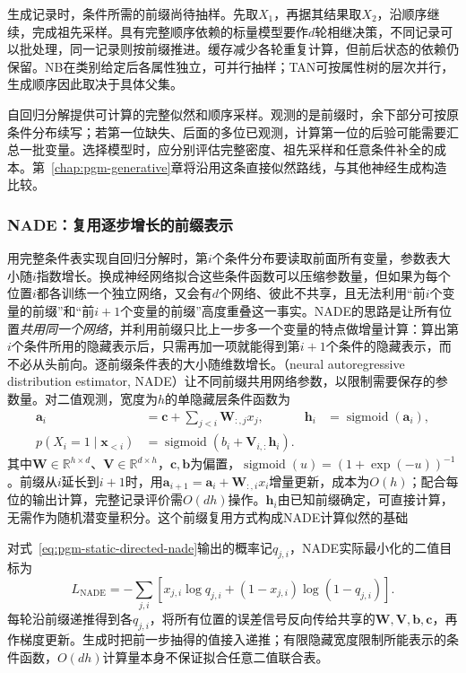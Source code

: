 生成记录时，条件所需的前缀尚待抽样。先取$X_1$，再据其结果取$X_2$，沿顺序继续，完成祖先采样。具有完整顺序依赖的标量模型要作$d$轮相继决策，不同记录可以批处理，同一记录则按前缀推进。缓存减少各轮重复计算，但前后状态的依赖仍保留。NB在类别给定后各属性独立，可并行抽样；TAN可按属性树的层次并行，生成顺序因此取决于具体父集。

自回归分解提供可计算的完整似然和顺序采样。观测的是前缀时，余下部分可按原条件分布续写；若第一位缺失、后面的多位已观测，计算第一位的后验可能需要汇总一批变量。选择模型时，应分别评估完整密度、祖先采样和任意条件补全的成本。第~\ref{chap:pgm-generative}章将沿用这条直接似然路线，与其他神经生成构造比较。

\subsubsection{NADE：复用逐步增长的前缀表示}
\label{sec:pgm-static-directed-nade-model}

用完整条件表实现自回归分解时，第$i$个条件分布要读取前面所有变量，参数表大小随$i$指数增长。换成神经网络拟合这些条件函数可以压缩参数量，但如果为每个位置$i$都各训练一个独立网络，又会有$d$个网络、彼此不共享，且无法利用“前$i$个变量的前缀”和“前$i+1$个变量的前缀”高度重叠这一事实。NADE的思路是让所有位置\emph{共用同一个网络}，并利用前缀只比上一步多一个变量的特点做增量计算：算出第$i$个条件所用的隐藏表示后，只需再加一项就能得到第$i+1$个条件的隐藏表示，而不必从头前向。逐前缀条件表的大小随维数增长。（neural autoregressive distribution estimator, NADE）让不同前缀共用网络参数，以限制需要保存的参数量。对二值观测，宽度为$h$的单隐藏层条件函数为
\begin{equation}
  \label{eq:pgm-static-directed-nade}
  \begin{aligned}
    \bm{a}_i&=\bm{c}+\sum_{j<i}\bm{W}_{:,j}x_j,&
    \bm{h}_i&=\operatorname{sigmoid}(\bm{a}_i),\\
    p(X_i=1\mid\bm{x}_{<i})
      &=\operatorname{sigmoid}
        (b_i+\bm{V}_{i,:}\bm{h}_i).
  \end{aligned}
\end{equation}
其中$\bm W\in\mathbb R^{h\times d}$、$\bm V\in\mathbb R^{d\times h}$，$\bm c,\bm b$为偏置，$\operatorname{sigmoid}(u)=(1+\exp(-u))^{-1}$。前缀从$i$延长到$i+1$时，用$\bm a_{i+1}=\bm a_i+\bm W_{:,i}x_i$增量更新，成本为$O(h)$；配合每位的输出计算，完整记录评价需$O(dh)$操作。$\bm h_i$由已知前缀确定，可直接计算，无需作为随机潜变量积分。这个前缀复用方式构成NADE计算似然的基础

对式~\eqref{eq:pgm-static-directed-nade}输出的概率记$q_{j,i}$，NADE实际最小化的二值目标为
\[
 L_{\mathrm{NADE}}=-\sum_{j,i}
 [x_{j,i}\log q_{j,i}+(1-x_{j,i})\log(1-q_{j,i})].
\]
每轮沿前缀递推得到各$q_{j,i}$，将所有位置的误差信号反向传给共享的$\bm W,\bm V,\bm b,\bm c$，再作梯度更新。生成时把前一步抽得的值接入递推；有限隐藏宽度限制所能表示的条件函数，$O(dh)$计算量本身不保证拟合任意二值联合表。

